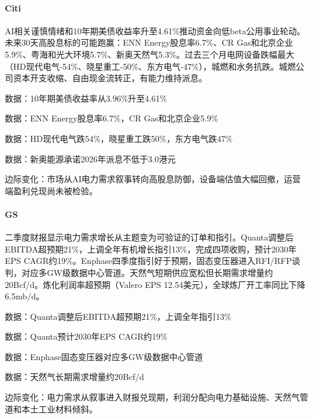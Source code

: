 \documentclass[11pt]{ctexart}
\begin{document}
\paragraph{Citi} AI相关谨慎情绪和10年期美债收益率升至4.61\%推动资金向低beta公用事业轮动。未来30天高股息标的可能跑赢：ENN Energy股息率6.7\%、CR Gas和北京企业5.9\%、粤海和光大环境5.7\%、新奥天然气5.3\%。过去三个月电网设备跌幅最大（HD现代电气-54\%、晓星重工-50\%、东方电气-47\%），城燃和水务抗跌。城燃公司资本开支收缩、自由现金流转正，有能力维持派息。
{\small\color{refgray}数据：10年期美债收益率从3.96\%升至4.61\%\par}
{\small\color{refgray}数据：ENN Energy股息率6.7\%，CR Gas和北京企业5.9\%\par}
{\small\color{refgray}数据：HD现代电气跌54\%，晓星重工跌50\%，东方电气跌47\%\par}
{\small\color{refgray}数据：新奥能源承诺2026年派息不低于3.0港元\par}
{\small\color{refgray}边际变化：市场从AI电力需求叙事转向高股息防御，设备端估值大幅回撤，运营端盈利兑现尚未被检验。\par}
\paragraph{GS} 二季度财报显示电力需求增长从主题变为可验证的订单和指引。Quanta调整后EBITDA超预期21\%，上调全年有机增长指引13\%，完成四项收购，预计2030年EPS CAGR约19\%。Enphase四季度指引好于预期，固态变压器进入RFI/RFP谈判，对应多GW级数据中心管道。天然气短期供应宽松但长期需求增量约20Bcf/d。炼化利润率超预期（Valero EPS 12.54美元），全球炼厂开工率同比下降6.5mb/d。
{\small\color{refgray}数据：Quanta调整后EBITDA超预期21\%，上调全年指引13\%\par}
{\small\color{refgray}数据：Quanta预计2030年EPS CAGR约19\%\par}
{\small\color{refgray}数据：Enphase固态变压器对应多GW级数据中心管道\par}
{\small\color{refgray}数据：天然气长期需求增量约20Bcf/d\par}
{\small\color{refgray}边际变化：电力需求从叙事进入财报兑现期，利润分配向电力基础设施、天然气管道和本土工业材料倾斜。\par}
\end{document}
